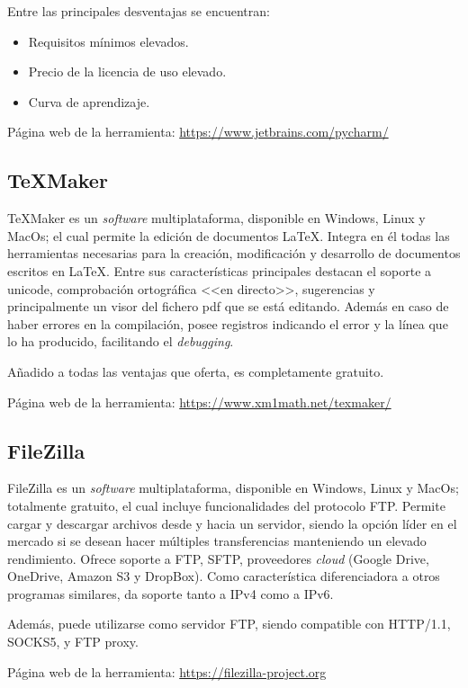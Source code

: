 Entre las principales desventajas se encuentran:
\begin{itemize}
\item Requisitos mínimos elevados. 
\item Precio de la licencia de uso elevado.
\item Curva de aprendizaje.
\end{itemize}

Página web de la herramienta: \url{https://www.jetbrains.com/pycharm/}

\subsection{\TeX Maker}
\TeX Maker es un \textit{software} multiplataforma, disponible en Windows, Linux y MacOs; el cual permite la edición de documentos \LaTeX. Integra en él todas las herramientas necesarias para la creación, modificación y desarrollo de documentos escritos en \LaTeX. Entre sus características principales destacan el soporte a unicode, comprobación ortográfica <<en directo>>, sugerencias y principalmente un visor del fichero pdf que se está editando. Además en caso de haber errores en la compilación, posee registros indicando el error y la línea que lo ha producido, facilitando el \textit{debugging}.

Añadido a todas las ventajas que oferta, es completamente gratuito.

Página web de la herramienta: \url{https://www.xm1math.net/texmaker/}

\subsection{FileZilla}
FileZilla es un \textit{software} multiplataforma, disponible en Windows, Linux y MacOs; totalmente gratuito, el cual incluye funcionalidades del protocolo FTP. Permite cargar y descargar archivos desde y hacia un servidor, siendo la opción líder en el mercado si se desean hacer múltiples transferencias manteniendo un elevado rendimiento. Ofrece soporte a FTP, SFTP, proveedores \textit{cloud} (Google Drive, OneDrive, Amazon S3 y DropBox). Como característica diferenciadora a otros programas similares, da soporte tanto a IPv4 como a IPv6. 

Además, puede utilizarse como servidor FTP, siendo compatible con HTTP/1.1, SOCKS5, y FTP proxy. 


Página web de la herramienta: \url{https://filezilla-project.org}


